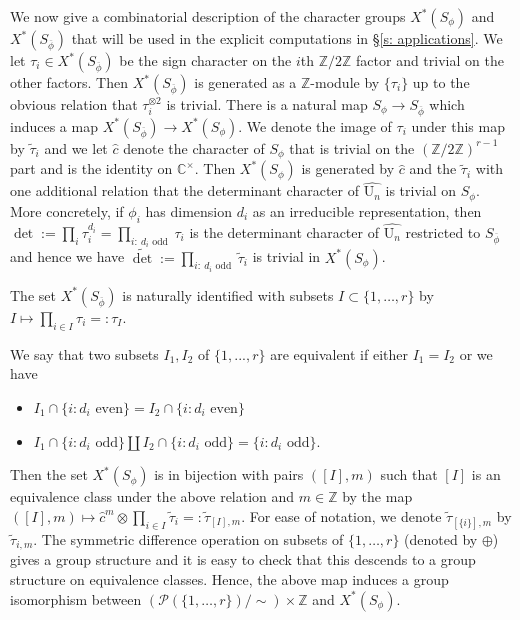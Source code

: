 \documentclass[reqno,11pt]{amsart}
\theoremstyle{remark}
\newcommand{\U}{\mathrm{U}}
\newcommand{\Z}{\mathbb{Z}}
\newcommand{\C}{\mathbb{C}}
\newcommand{\mc}{\mathcal}
\newcommand{\ov}{\overline}
\newcommand{\ttau}{\tilde{\tau}}
\begin{document}
We now give a combinatorial description of the character groups $X^*(S_{\phi})$ and $X^*(S_{\ov{\phi}})$ that will be used in the explicit computations in \S \ref{s: applications}. We let $\tau_i \in X^*(S_{\ov{\phi}})$ be the sign character on the $i$th $\Z/2\Z$ factor and trivial on the other factors. Then $X^*(S_{\ov{\phi}})$ is generated as a $\Z$-module by $\{\tau_i\}$ up to the obvious relation that $\tau^{\otimes 2}_i$ is trivial. There is a natural map $S_{\phi} \to S_{\ov{\phi}}$ which induces a map $X^*(S_{\ov{\phi}}) \to X^*(S_{\phi})$. We denote the image of $\tau_i$ under this map by $\ttau_i$ and we let $\widehat{c}$ denote the character of $S_{\phi}$ that is trivial on the $(\Z/2 \Z)^{r-1}$ part and is the identity on $\C^{\times}$. Then $X^*(S_{\phi})$ is generated by $\widehat{c}$ and the $\ttau_i$ with one additional relation that the determinant character of $\widehat{\U_n}$ is trivial on $S_{\phi}$. More concretely, if $\phi_i$ has dimension $d_i$ as an irreducible representation, then $\det := \prod\limits_i \tau^{d_i}_i = \prod\limits_{i: ~ d_i \text{ odd }} \tau_i $ is the determinant character of $\widehat{\U_n}$ restricted to $S_{\ov{\phi}}$ and hence we have $\tilde{\det} := \prod\limits_{i:  ~ d_i \text{ odd }} \ttau_i$ is trivial in $X^*(S_{\phi})$.

The set $X^*(S_{\ov{\phi}})$ is naturally identified with subsets $I \subset \{1, \dots, r\}$ by $I \mapsto \prod\limits_{i \in I} \tau_i =: \tau_I$. 

We say that two subsets $I_1, I_2$ of $\{1, ..., r\}$ are equivalent if either $I_1 = I_2$ or we have
\begin{itemize}
    \item $I_1 \cap \{i: d_i \text{ even}\} = I_2 \cap \{i: d_i \text{ even}\}$
    \item $I_1 \cap \{i: d_i \text{ odd}\} \coprod I_2 \cap \{i: d_i \text{ odd}\} = \{i: d_i \text{ odd}\}.$
\end{itemize}
Then the set $X^*(S_{\phi})$ is in bijection with pairs $([I], m)$ such that $[I]$ is an equivalence class under the above relation and $m \in \Z$ by the map $([I], m) \mapsto \widehat{c}^m \otimes \prod\limits_{i \in I} \ttau_i =: \ttau_{[I],m}$. For ease of notation, we denote $\ttau_{[\{i\}], m}$ by $\ttau_{i,m}$. The symmetric difference operation on subsets of $\{1, \dots, r\}$ (denoted by $\oplus$) gives a group structure and it is easy to check that this descends to a group structure on equivalence classes. Hence, the above map induces a group isomorphism between $(\mc{P}(\{1, \dots, r\})/ \sim) \times \Z$ and $X^*(S_{\phi})$.
    
\end{document}
